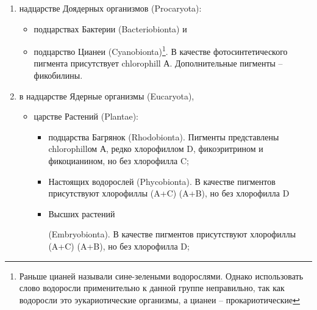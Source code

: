 \begin{enumerate}

	\item надцарстве Доядерных организмов (Procaryota): 

		\begin{itemize}

			\item подцарствах Бактерии (Bacteriobionta) и 
			\item подцарство Цианеи (Cyanobionta)\footnote{Раньше цианей называли сине-зелеными водорослями. Однако использовать слово водоросли применительно к данной группе неправильно, так как водоросли это эукариотические организмы, а цианеи -- прокариотические}. В качестве фотосинтетического пигмента присутствует \gls{chlorophill} А. Дополнительные пигменты -- фикобилины.

		\end{itemize}
 
	\item в надцарстве Ядерные организмы (Eucaryota),

		\begin{itemize}

			\item царстве Растений (Plantae): 

				\begin{itemize}

						\item подцарства Багрянок (Rhodobionta). Пигменты представлены \gls{chlorophill}ом А, редко хлорофиллом D, фикоэритрином и фикоцианином, но без хлорофилла C; 
						\item Настоящих водорослей (Phycobionta). В качестве пигментов присутствуют хлорофиллы (A+C) (A+B), но без хлорофилла D
						\item \hypertarget{embryobionta}{Высших растений} (Embryobionta). В качестве пигментов присутствуют хлорофиллы (A+C) (A+B), но без хлорофилла D;

				\end{itemize}

		\end{itemize} 

\end{enumerate}
 

